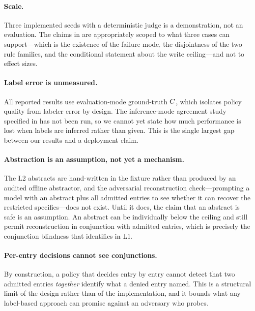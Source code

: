 \paragraph{Scale.} Three implemented seeds with a deterministic judge is a
demonstration, not an evaluation. The claims in  are
appropriately scoped to what three cases can support---which is the existence
of the failure mode, the disjointness of the two rule families, and the
conditional statement about the write ceiling---and not to effect sizes.

\paragraph{Label error is unmeasured.} All reported results use evaluation-mode
ground-truth $C$, which isolates policy quality from labeler error by
design. The inference-mode agreement study specified in
 has not been run, so we cannot yet state how much
performance is lost when labels are inferred rather than given. This is the
single largest gap between our results and a deployment claim.

\paragraph{Abstraction is an assumption, not yet a mechanism.} The L2 abstracts
are hand-written in the fixture rather than produced by an audited offline
abstractor, and the adversarial reconstruction check---prompting a model with
an abstract plus all admitted entries to see whether it can recover the
restricted specifics---does not exist. Until it does, the claim that an
abstract is safe is an assumption. An abstract can be individually below the
ceiling and still permit reconstruction in conjunction with admitted entries,
which is precisely the conjunction blindness that 
identifies in L1.

\paragraph{Per-entry decisions cannot see conjunctions.} By construction, a
policy that decides entry by entry cannot detect that two admitted entries
\emph{together} identify what a denied entry named. This is a structural limit
of the design rather than of the implementation, and it bounds what any
label-based approach can promise against an adversary who probes.

